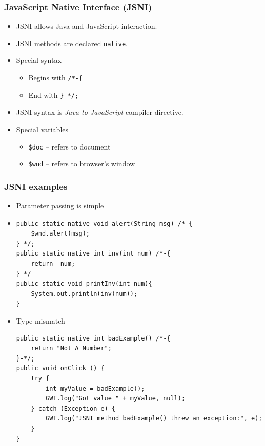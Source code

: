 \documentclass[10pt,table, xcolor=pdflatex]{beamer}
\begin{document}
\begin{frame}[fragile]\frametitle{JavaScript Native Interface (JSNI)}
	\begin{itemize}
		\item JSNI allows Java and JavaScript interaction.
		\item JSNI methods are declared \texttt{native}.
		\item Special syntax
          \begin{itemize}
        	\item Begins with \verb'/*-{'
            \item End with \verb'}-*/;'
          \end{itemize}
		\item JSNI syntax is \emph{Java-to-JavaScript} compiler directive.
		\item Special variables
          \begin{itemize}
        	\item \verb|$doc| -- refers to document
        	\item \verb|$wnd| -- refers to browser’s window
          \end{itemize}
	\end{itemize}
\end{frame}


\begin{frame}[fragile]\frametitle{JSNI examples}
	\begin{itemize}
    	\item Parameter passing is simple
		\item[]
        	\lstset{language=Java, basicstyle=\footnotesize\ttfamily}
			\begin{lstlisting}
public static native void alert(String msg) /*-{
    $wnd.alert(msg);
}-*/;
public static native int inv(int num) /*-{
    return -num;
}-*/
public static void printInv(int num){
    System.out.println(inv(num));
}
			\end{lstlisting}
		\item Type mismatch
			\lstset{language=Java, basicstyle=\footnotesize\ttfamily}
			\begin{lstlisting}
public static native int badExample() /*-{
    return "Not A Number";
}-*/;
public void onClick () {
    try {
        int myValue = badExample();
        GWT.log("Got value " + myValue, null);
    } catch (Exception e) {
        GWT.log("JSNI method badExample() threw an exception:", e);
    }
}
			\end{lstlisting}
	\end{itemize}
\end{frame}
\end{document}
